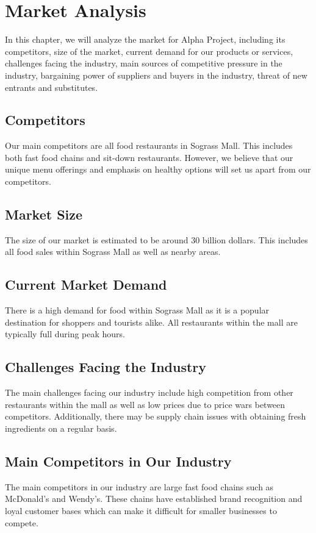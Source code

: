 \section{Market Analysis}
\label{sec:market_analysis}

In this chapter, we will analyze the market for Alpha Project, including its competitors, size of the market, current demand for our products or services, challenges facing the industry, main sources of competitive pressure in the industry, bargaining power of suppliers and buyers in the industry, threat of new entrants and substitutes.

\subsection{Competitors}
Our main competitors are all food restaurants in Sograss Mall. This includes both fast food chains and sit-down restaurants. However, we believe that our unique menu offerings and emphasis on healthy options will set us apart from our competitors.

\subsection{Market Size}
The size of our market is estimated to be around 30 billion dollars. This includes all food sales within Sograss Mall as well as nearby areas.

\subsection{Current Market Demand}
There is a high demand for food within Sograss Mall as it is a popular destination for shoppers and tourists alike. All restaurants within the mall are typically full during peak hours.

\subsection{Challenges Facing the Industry}
The main challenges facing our industry include high competition from other restaurants within the mall as well as low prices due to price wars between competitors. Additionally, there may be supply chain issues with obtaining fresh ingredients on a regular basis.

\subsection{Main Competitors in Our Industry}
The main competitors in our industry are large fast food chains such as McDonald's and Wendy's. These chains have established brand recognition and loyal customer bases which can make it difficult for smaller businesses to compete.

